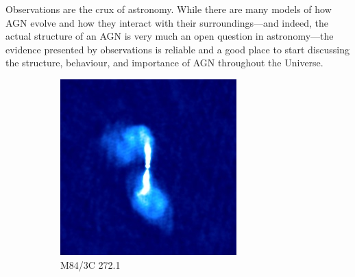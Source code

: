 \documentclass[11pt, a4paper]{book}
\begin{document}
        Observations are the crux of astronomy. While there are many models of how AGN evolve and how they interact with their surroundings---and indeed, the actual structure of an AGN is very much an open question in astronomy---the evidence presented by observations is reliable and a good place to start discussing the structure, behaviour, and importance of AGN throughout the Universe.

        \begin{figure}
            \centering
            \begin{subfigure}{0.45\textwidth}
                \includegraphics[width=\textwidth]{images/3C_272-1.jpg}
                \caption{M84/3C 272.1}
                \label{fig:m84}
            \end{subfigure}
            \begin{subfigure}{0.45\textwidth}

\end{subfigure}
\end{figure}
\end{document}
